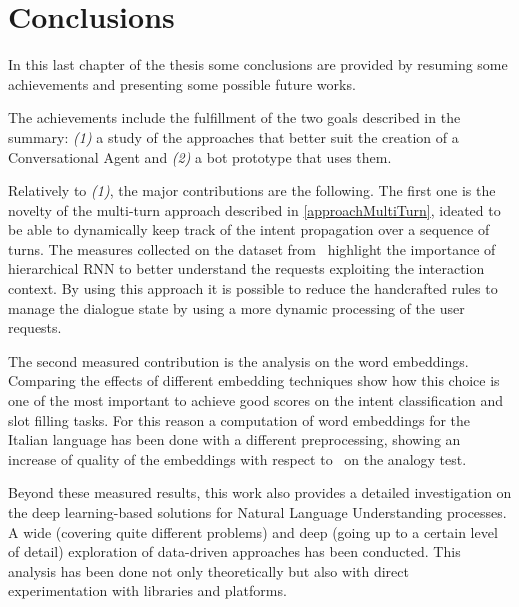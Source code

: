 


\chapter{Conclusions}
\label{conclusion}

In this last chapter of the thesis some conclusions are provided by resuming some achievements and presenting some possible future works.

The achievements include the fulfillment of the two goals described in the summary: \textit{(1)} a study of the approaches that better suit the creation of a Conversational Agent and \textit{(2)} a bot prototype that uses them.

Relatively to \textit{(1)}, the major contributions are the following. The first one is the novelty of the multi-turn approach described in \ref{approachMultiTurn}, ideated to be able to dynamically keep track of the intent propagation over a sequence of turns. The measures collected on the dataset from~\cite{eric2017key} highlight the importance of hierarchical RNN to better understand the requests exploiting the interaction context. By using this approach it is possible to reduce the handcrafted rules to manage the dialogue state by using a more dynamic processing of the user requests.

The second measured contribution is the analysis on the word embeddings. Comparing the effects of different embedding techniques show how this choice is one of the most important to achieve good scores on the intent classification and slot filling tasks. For this reason a computation of word embeddings for the Italian language has been done with a different preprocessing, showing an increase of quality of the embeddings with respect to~\cite{berardi2015word} on the analogy test.

Beyond these measured results, this work also provides a detailed investigation on the deep learning-based solutions for Natural Language Understanding processes. A wide (covering quite different problems) and deep (going up to a certain level of detail) exploration of data-driven approaches has been conducted. This analysis has been done not only theoretically but also with direct experimentation with libraries and platforms.

